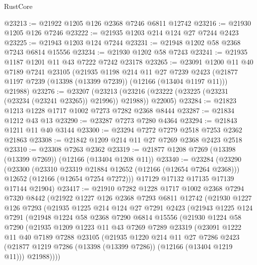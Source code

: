 \begin{lexlean}{RustCore}
\begin{coremodule}
@23213 := @21922 @1205 @126 @2368 @7246 @6811 @12742
@23216 := @21930 @1205 @126 @7246
@23222 := @21935 @1203 @214 @124 @27 @7244 @2423
@23225 := @21943 @1203 @124 @7244
@23231 := @21948 @1202 @58 @2368 @7243 @6814 @15556
@23234 := @21930 @1202 @58 @7243
@23241 := @21935 @1187 @1201 @11 @43 @7222 @7242 @23178
@23265 := @23091
    @1200
    @11
    @40
    @7189
    @7241
    @23105
    (@21935
      @1198
      @214
      @11
      @27
      @7239
      @2423
      (@21877 @1197 @7239 (@13398 (@13399 @7239)) (@12166 (@13404 @1197 @11)))
      @21988)
@23276 := @23207
    (@23213 (@23216 (@23222 (@23225 (@23231 (@23234 (@23241 @23265)) @21996)) @21988)) @22005)
@23284 := @21823 @1213 @1228 @1717 @1002 @7273 @7282 @2368 @8444
@23287 := @21834 @1212 @43 @13
@23290 := @23287 @7273 @7280 @4364
@23294 := @21843 @1211 @11 @40 @3144
@23300 := @23294 @7272 @7279 @2518 @7253 @2362 @21863
@23308 := @21842 @1209 @214 @11 @27 @7269 @2368 @2423 @2518
@23310 := @23308 @7263 @2362
@23319 := @21877 @1208 @7269 (@13398 (@13399 @7269)) (@12166 (@13404 @1208 @11))
@23340 := @23284
    (@23290
      (@23300
        (@23310 @23319 @21884 @12652 (@12166 (@12654 @7264 @2368)))
        @12652
        (@12166 (@12654 @7254 @7272)))
      @17129
      @17132
      @17135
      @17139
      @17144
      @21904)
@23417 := @21910
    @7282
    @1228
    @1717
    @1002
    @2368
    @7294
    @7320
    @8442
    (@21922
      @1227
      @126
      @2368
      @7293
      @6811
      @12742
      (@21930
        @1227
        @126
        @7293
        (@21935
          @1225
          @214
          @124
          @27
          @7291
          @2423
          (@21943
            @1225
            @124
            @7291
            (@21948
              @1224
              @58
              @2368
              @7290
              @6814
              @15556
              (@21930
                @1224
                @58
                @7290
                (@21935
                  @1209
                  @1223
                  @11
                  @43
                  @7269
                  @7289
                  @23319
                  (@23091
                    @1222
                    @11
                    @40
                    @7189
                    @7288
                    @23105
                    (@21935
                      @1220
                      @214
                      @11
                      @27
                      @7286
                      @2423
                      (@21877 @1219 @7286 (@13398 (@13399 @7286)) (@12166 (@13404 @1219 @11)))
                      @21988))))

\end{coremodule}
\end{lexlean}
